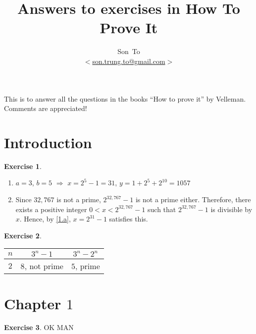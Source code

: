 \documentclass[a4paper,11pt]{article}
\author{Son~To\\
$<$\href{mailto:son.trung.to@gmail.com}{son.trung.to@gmail.com}$>$}
\affil{StaffPoint Oy}
\title{Answers to exercises in How To Prove It}
\theoremstyle{plain} \newtheorem{id}{Lemma}[section]
\theoremstyle{definition} \newtheorem{ex}{Exercise}[section]
\theoremstyle{remark}     \newtheorem{ab}{Remark}[section]
\begin{document}
  \maketitle
  This is to answer all the questions in the books ``How to prove it'' by Velleman.
  Comments are appreciated!

  \clearpage
  \tableofcontents
  \clearpage

  \section{Introduction}
  \begin{ex}
    \begin{enumerate}[label=(\alph*)]
      \item\label{1.a} $a=3$, $b=5$ $\Rightarrow$ $x=2^5-1=31$, $y=1+2^5+2^{10}=1057$
      \item Since $32,767$ is not a prime, $2^{32,767} - 1$ is not a prime either.
      Therefore, there exists a positive integer $0<x<2^{32,767}-1$ such that
      $2^{32,767}-1$ is divisible by $x$. Hence, by \ref{1.a}, $x=2^{31}-1$ satisfies this.
    \end{enumerate}
  \end{ex}

  \begin{ex}
    $ $\newline
    \begin{tabular}{c c c}
      $n$ & $3^n - 1$ & $3^n - 2^n$ \\
      \hline
      $2$ & $8$, not prime & $5$, prime
    \end{tabular}
  \end{ex}
  \section{Chapter $1$}
  \begin{ex}
    OK MAN
  \end{ex}
\end{document}
